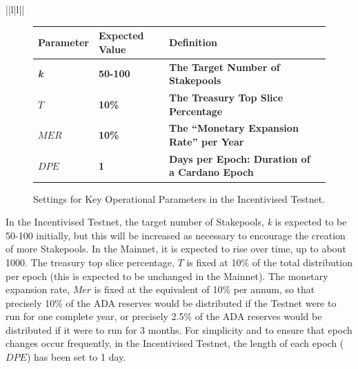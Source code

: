 \documentclass[11pt,a4paper,dvipsnames,twosided,final]{article}
\newcommand{\ada}{ADA{}}
\newcommand{\cardano}[1]{Cardano}
\begin{document}
\begin{tabular}{||l|l||}
\begin{figure}[h!]
\begin{center}
\begin{tabular}{||l|l|p{10cm}|l||}
  \hline \hline
\textbf{Parameter} & \textbf{Expected Value} & \textbf{Definition} \\\hline
\textbf{\color{green} \emph{k}} & \textbf{\color{green} 50-100} &\textbf{\color{green}  The Target Number of Stakepools} \\\hline
\textbf{\color{green} $T$} & \textbf{\color{green} 10\%} & \textbf{\color{green} The Treasury Top Slice Percentage} \\\hline
\textbf{\color{green} $\textit{MER}$} & \textbf{\color{green} 10\%}&  \textbf{\color{green} The ``Monetary Expansion Rate'' per Year}\\\hline
\textbf{\color{green} $\textit{DPE}$} & \textbf{\color{green} 1} & \textbf{\color{green}  Days per Epoch: Duration of a \cardano{} Epoch} \\\hline
  \hline
\end{tabular}
\end{center}
\caption{Settings for Key Operational Parameters in the Incentivised Testnet.}
\end{figure}

\noindent
In the Incentivised Testnet,
the target number of Stakepools, \emph{k} is expected to be 50-100 initially, but this will be increased as necessary to encourage the creation of more Stakepools.
In the Mainnet, it is expected to rise over time, up to about 1000.
The treasury top slice percentage, $T$ is fixed at 10\% of the total distribution per epoch (this is expected to be unchanged in the Mainnet).
The monetary expansion rate, $\textit{Mer}$ is fixed at the equivalent of 10\% per annum, so that precisely 10\% of the \ada{} reserves would be distributed
if the Testnet were to run for one complete year, or precisely 2.5\% of the \ada{} reserves would be distributed if it were to run for 3 months.
For simplicity and to ensure that epoch changes occur frequently, in the Incentivised Testnet, the length of each epoch ($\textit{DPE}$) has been set to 1 day.


\end{tabular}
\end{document}

